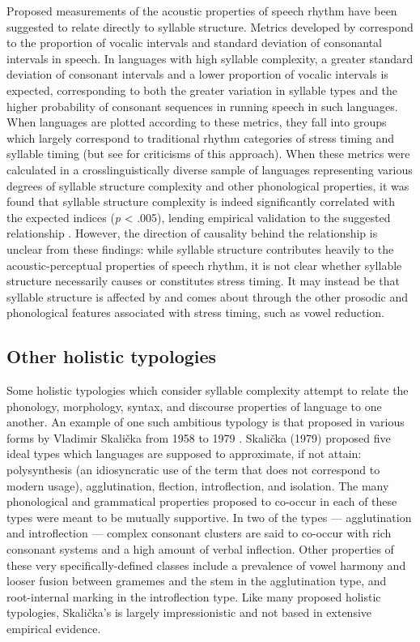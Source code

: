   Proposed measurements of the acoustic properties of speech rhythm have been suggested to relate directly to syllable structure. Metrics developed by \citet{RamusEtAl1999} correspond to the proportion of vocalic intervals and standard deviation of consonantal intervals in speech. In languages with high syllable complexity, a greater standard deviation of consonant intervals and a lower proportion of vocalic intervals is expected, corresponding to both the greater variation in syllable types and the higher probability of consonant sequences in running speech in such languages. When languages are plotted according to these metrics, they fall into groups which largely correspond to traditional rhythm categories of stress timing and syllable timing (but see \citealt{WigetEtAl2010} for criticisms of this approach). When these metrics were calculated in a crosslinguistically diverse sample of languages representing various degrees of syllable structure complexity and other phonological properties, it was found that syllable structure complexity is indeed significantly correlated with the expected indices (\textit{p} < .005), lending empirical validation to the suggested relationship \citep{EasterdayEtAl2011}. However, the direction of causality behind the relationship is unclear from these findings: while syllable structure contributes heavily to the acoustic-perceptual properties of speech rhythm, it is not clear whether syllable structure necessarily causes or constitutes stress timing. It may instead be that syllable structure is affected by and comes about through the other prosodic and phonological features associated with stress timing, such as vowel reduction.

\subsection{Other holistic typologies}\label{sec:1.3.2}

\textsf{} Some holistic typologies which consider syllable complexity attempt to relate the phonology, morphology, syntax, and discourse properties of language to one another. An example of one such ambitious typology is that proposed in various forms by Vladimir Skalička from 1958 to 1979 \citep{Plank1998}. Skalička (1979) proposed five ideal types which languages are supposed to approximate, if not attain: polysynthesis (an idiosyncratic use of the term that does not correspond to modern usage), agglutination, flection, introflection, and isolation. The many phonological and grammatical properties proposed to co-occur in each of these types were meant to be mutually supportive. In two of the types — agglutination and introflection — complex consonant clusters are said to co-occur with rich consonant systems and a high amount of verbal inflection. Other properties of these very specifically-defined classes include a prevalence of vowel harmony and looser fusion between gramemes and the stem in the agglutination type, and root-internal marking in the introflection type. Like many proposed holistic typologies, Skalička’s is largely impressionistic and not based in extensive empirical evidence.

